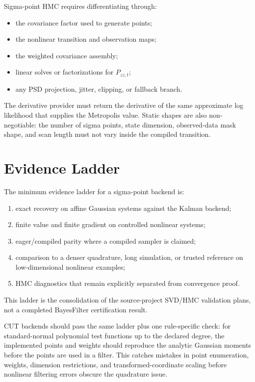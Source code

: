 Sigma-point HMC requires differentiating through:
\begin{itemize}
  \item the covariance factor used to generate points;
  \item the nonlinear transition and observation maps;
  \item the weighted covariance assembly;
  \item linear solves or factorizations for $P_{zz,t}$;
  \item any PSD projection, jitter, clipping, or fallback branch.
\end{itemize}
The derivative provider must return the derivative of the same approximate log
likelihood that supplies the Metropolis value.  Static shapes are also
non-negotiable: the number of sigma points, state dimension, observed-data
mask shape, and scan length must not vary inside the compiled transition.

\section{Evidence Ladder}
\label{sec:bf-sigma-point-evidence-ladder}

The minimum evidence ladder for a sigma-point backend is:
\begin{enumerate}[label=(\roman*)]
  \item exact recovery on affine Gaussian systems against the Kalman backend;
  \item finite value and finite gradient on controlled nonlinear systems;
  \item eager/compiled parity where a compiled sampler is claimed;
  \item comparison to a denser quadrature, long simulation, or trusted
    reference on low-dimensional nonlinear examples;
  \item HMC diagnostics that remain explicitly separated from convergence
    proof.
\end{enumerate}
This ladder is the consolidation of the source-project SVD/HMC validation
plans, not a completed BayesFilter certification result.

CUT backends should pass the same ladder plus one rule-specific check: for
standard-normal polynomial test functions up to the declared degree, the
implemented points and weights should reproduce the analytic Gaussian moments
before the points are used in a filter.  This catches mistakes in point
enumeration, weights, dimension restrictions, and transformed-coordinate
scaling before nonlinear filtering errors obscure the quadrature issue.
